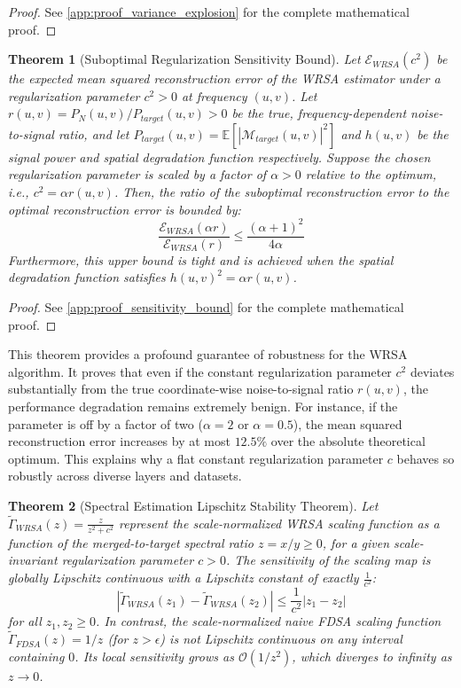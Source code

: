 \documentclass{article}
\theoremstyle{plain}
\newtheorem{theorem}{Theorem}[section]
\theoremstyle{definition}
\theoremstyle{remark}
\begin{document}
\begin{proof}
  See \cref{app:proof_variance_explosion} for the complete mathematical proof.
\end{proof}

\begin{theorem}[Suboptimal Regularization Sensitivity Bound]
  Let $\mathcal{E}_{WRSA}(c^2)$ be the expected mean squared reconstruction error of the WRSA estimator under a regularization parameter $c^2 > 0$ at frequency $(u, v)$. Let $r(u, v) = P_N(u, v)/P_{target}(u, v) > 0$ be the true, frequency-dependent noise-to-signal ratio, and let $P_{target}(u, v) = \mathbb{E}[|\mathcal{M}_{target}(u, v)|^2]$ and $h(u, v)$ be the signal power and spatial degradation function respectively. Suppose the chosen regularization parameter is scaled by a factor of $\alpha > 0$ relative to the optimum, i.e., $c^2 = \alpha r(u, v)$. Then, the ratio of the suboptimal reconstruction error to the optimal reconstruction error is bounded by:
  \begin{equation}
    \frac{\mathcal{E}_{WRSA}(\alpha r)}{\mathcal{E}_{WRSA}(r)} \le \frac{(\alpha + 1)^2}{4\alpha}
  \end{equation}
  Furthermore, this upper bound is tight and is achieved when the spatial degradation function satisfies $h(u, v)^2 = \alpha r(u, v)$.
\end{theorem}

\begin{proof}
  See \cref{app:proof_sensitivity_bound} for the complete mathematical proof.
\end{proof}

This theorem provides a profound guarantee of robustness for the WRSA algorithm. It proves that even if the constant regularization parameter $c^2$ deviates substantially from the true coordinate-wise noise-to-signal ratio $r(u,v)$, the performance degradation remains extremely benign. For instance, if the parameter is off by a factor of two ($\alpha = 2$ or $\alpha = 0.5$), the mean squared reconstruction error increases by at most $12.5\%$ over the absolute theoretical optimum. This explains why a flat constant regularization parameter $c$ behaves so robustly across diverse layers and datasets.

\begin{theorem}[Spectral Estimation Lipschitz Stability Theorem]
  Let $\tilde{\Gamma}_{WRSA}(z) = \frac{z}{z^2 + c^2}$ represent the scale-normalized WRSA scaling function as a function of the merged-to-target spectral ratio $z = x/y \ge 0$, for a given scale-invariant regularization parameter $c > 0$. The sensitivity of the scaling map is globally Lipschitz continuous with a Lipschitz constant of exactly $\frac{1}{c^2}$:
  \begin{equation}
    |\tilde{\Gamma}_{WRSA}(z_1) - \tilde{\Gamma}_{WRSA}(z_2)| \le \frac{1}{c^2} |z_1 - z_2|
  \end{equation}
  for all $z_1, z_2 \ge 0$.
  In contrast, the scale-normalized naive FDSA scaling function $\tilde{\Gamma}_{FDSA}(z) = 1/z$ (for $z > \epsilon$) is not Lipschitz continuous on any interval containing $0$. Its local sensitivity grows as $\mathcal{O}(1/z^2)$, which diverges to infinity as $z \to 0$.
\end{theorem}
\end{document}
